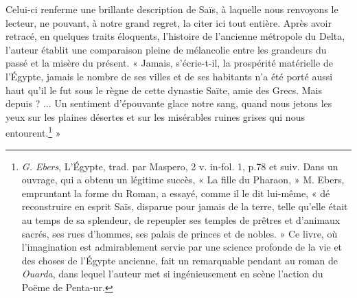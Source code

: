 \documentclass[letterpaper,twocolumn,openany,nodeprecatedcode]{dndbook}
\begin{document}
Celui-ci renferme une brillante description de Saïs, à laquelle nous renvoyons le lecteur, ne pouvant, à notre grand regret, la citer ici tout entière. Après avoir retracé, en quelques traits éloquents, l'histoire de l'ancienne métropole du Delta, l'auteur établit une comparaison pleine de mélancolie entre les grandeurs du passé et la misère du présent. « Jamais, s'écrie-t-il, la prospérité matérielle de l'Égypte, jamais le nombre de ses villes et de ses habitants n'a été porté aussi haut qu'il le fut sous le règne de cette dynastie Saïte, amie des Grecs. Mais depuis ? ... Un sentiment d'épouvante glace notre sang, quand nous jetons les yeux sur les plaines désertes et sur les misérables ruines grises qui nous entourent.\footnote{\emph{G. Ebers}, L'Égypte, trad. par Maspero, 2 v. in-fol. 1, p.78 et suiv. Dans un ouvrage, qui a obtenu un légitime succès, « La fille du Pharaon, » M. Ebers, empruntant la forme du Roman, a essayé, comme il le dit lui-même, « dé reconstruire en esprit Saïs, disparue pour jamais de la terre, telle qu'elle était au temps de sa splendeur, de repeupler ses temples de prêtres et d'animaux sacrés, ses rues d'hommes, ses palais de princes et de nobles. » Ce livre, où l'imagination est admirablement servie par une science profonde de la vie et des choses de l'Égypte ancienne, fait un remarquable pendant au roman de \emph{Ouarda}, dans lequel l'auteur met si ingénieusement en scène l'action du Poëme de Penta-ur.} »
\end{document}
